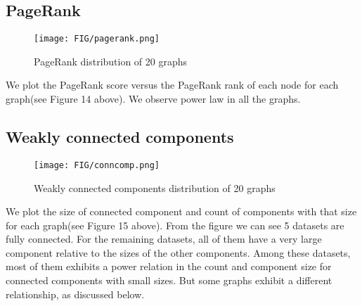 \subsection{PageRank}
\begin{figure}[H]
\begin{center}
\texttt{[image: FIG/pagerank.png]}
\caption{PageRank distribution of 20 graphs}
\end{center}
\end{figure}

\par We plot the PageRank score versus the PageRank rank of each node for each graph(see Figure 14 above). We observe power law in all the graphs.

\subsection{Weakly connected components}
\begin{figure}[H]
\begin{center}
\texttt{[image: FIG/conncomp.png]}
\caption{Weakly connected components distribution of 20 graphs}
\end{center}
\end{figure}

\par We plot the size of connected component and count of components with that size for each graph(see Figure 15 above). From the figure we can see 5 datasets are fully connected. For the remaining datasets, all of them have a very large component relative to the sizes of the other components. Among these datasets, most of them exhibits a power relation in the count and component size for connected components with small sizes. But some graphs exhibit a different relationship, as discussed below.

